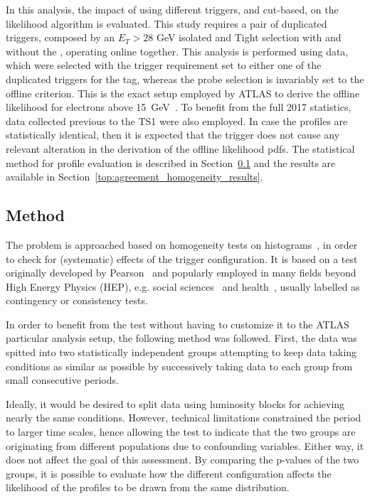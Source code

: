 In this 
analysis, the impact of using different triggers, \rnn{} and cut-based, on the likelihood algorithm is evaluated. This study requires a pair of duplicated triggers, composed by an $E_T > 28$ GeV isolated and Tight selection with and without the \rnn{}, operating online together. 
This analysis is performed using \Zee{} \tnp{} data, which were selected with the trigger requirement set to either one of the duplicated triggers for the tag, whereas the probe selection is invariably set to the offline \vloose{} criterion. This is the exact setup employed by ATLAS to derive the offline likelihood for electrons above \SI{15}{\GeV}~\cite{aaboud2019electron}. To benefit from the full 2017 statistics, data collected previous to the TS1 were also employed. In case the profiles are statistically identical, then it is expected that the \rnn{} trigger does not cause any relevant alteration in the derivation of the offline likelihood pdfs.  The statistical method for profile evaluation is described in Section~\ref{top:homogeneity_method} and the results are available in Section~\ref{top:agreement_homogeneity_results}.




\subsection{Method}\label{top:homogeneity_method}



The problem is approached based on homogeneity tests on histograms~\cite{homogeneity_test}, in order to check for (systematic) effects of the trigger configuration. It is based on a test originally developed by Pearson~\cite{pearson1911probability} and popularly employed in many fields beyond High Energy Physics (HEP), e.g. social sciences~\cite{wickens2014multiway} and health~\cite{ma2015homogeneity}, usually labelled as contingency or consistency tests.

In order to benefit from the test without having to customize it to the ATLAS particular analysis setup, the following method was followed. First, the data was spitted into two
statistically independent groups attempting to keep data taking conditions as
similar as possible by successively taking data to each group from small
consecutive periods.

Ideally, it would be desired to split data using luminosity
blocks for achieving nearly the same conditions. However, technical limitations
constrained the period to larger time scales, hence allowing the test to
indicate that the two groups are originating from different populations due to
confounding variables. Either way, it does not affect the goal of this assessment. 
By comparing the p-values of the two groups, it is possible to evaluate how the different configuration affects the likelihood of the profiles to be drawn from the same distribution. 


